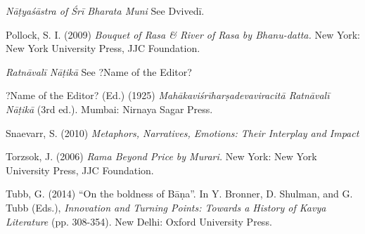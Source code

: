 \begin{thebibliography}{99}
\textsl{Nāṭyaśāstra of Śrī Bharata Muni} See Dvivedī.

Pollock, S. I. (2009) \textsl{Bouquet of Rasa \& River of Rasa by Bhanu-datta.} New York: New York University Press, JJC Foundation.

\textsl{Ratnāvalī Nāṭikā} See ?Name of the Editor?

?Name of the Editor? (Ed.) (1925) \textsl{Mahākaviśrīharṣadevaviracitā Ratnāvalī Nāṭikā} (3rd ed.). Mumbai: Nirnaya Sagar Press.

Snaevarr, S. (2010) \textsl{Metaphors, Narratives, Emotions: Their Interplay and Impact}

Torzsok, J. (2006) \textsl{Rama Beyond Price by Murari.} New York: New York University Press, JJC Foundation.

Tubb, G. (2014) “On the boldness of Bāṇa”. In Y. Bronner, D. Shulman, and G. Tubb (Eds.), \textsl{Innovation and Turning Points: Towards a History of Kavya Literature} (pp. 308-354). New Delhi: Oxford University Press.
\end{thebibliography}


